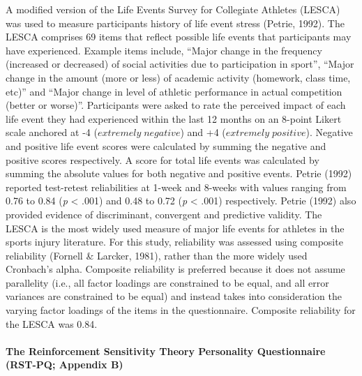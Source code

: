 \documentclass[man,floatsintext]{apa6}
\let\oldparagraph\paragraph
\renewcommand{\paragraph}[1]{\oldparagraph{#1}\mbox{}}
\begin{document}
A modified version of the Life Events Survey for Collegiate Athletes (LESCA) was used to measure participants history of life event stress (Petrie, 1992).
The LESCA comprises 69 items that reflect possible life events that participants may have experienced.
Example items include, \enquote{Major change in the frequency (increased or decreased) of social activities due to participation in sport}, \enquote{Major change in the amount (more or less) of academic activity (homework, class time, etc)} and \enquote{Major change in level of athletic performance in actual competition (better or worse)}.
Participants were asked to rate the perceived impact of each life event they had experienced within the last 12 months on an 8-point Likert scale anchored at -4 (\(extremely\;negative\)) and +4 (\(extremely\;positive\)).
Negative and positive life event scores were calculated by summing the negative and positive scores respectively.
A score for total life events was calculated by summing the absolute values for both negative and positive events.
Petrie (1992) reported test-retest reliabilities at 1-week and 8-weeks with values ranging from 0.76 to 0.84 (\emph{p} \textless{} .001) and 0.48 to 0.72 (\emph{p} \textless{} .001) respectively.
Petrie (1992) also provided evidence of discriminant, convergent and predictive validity.
The LESCA is the most widely used measure of major life events for athletes in the sports injury literature.
For this study, reliability was assessed using composite reliability (Fornell \& Larcker, 1981), rather than the more widely used Cronbach's alpha.
Composite reliability is preferred because it does not assume parallelity (i.e., all factor loadings are constrained to be equal, and all error variances are constrained to be equal) and instead takes into consideration the varying factor loadings of the items in the questionnaire.
Composite reliability for the LESCA was 0.84.

\hypertarget{the-reinforcement-sensitivity-theory-personality-questionnaire-rst-pq-appendix-b}{%
\paragraph{The Reinforcement Sensitivity Theory Personality Questionnaire (RST-PQ; Appendix B)}\label{the-reinforcement-sensitivity-theory-personality-questionnaire-rst-pq-appendix-b}}
\end{document}
